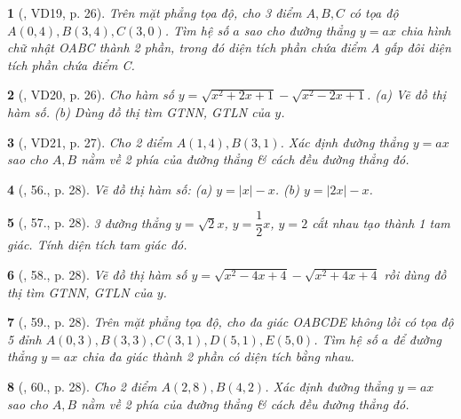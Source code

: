 \documentclass{article}
\newtheorem{baitoan}{}
\begin{document}
\begin{baitoan}[\cite{Binh_Toan_9_tap_1}, VD19, p. 26]
	Trên mặt phẳng tọa độ, cho 3 điểm $A,B,C$ có tọa độ $A(0,4),B(3,4),C(3,0)$. Tìm hệ số $a$ sao cho đường thẳng $y = ax$ chia hình chữ nhật OABC thành 2 phần, trong đó diện tích phần chứa điểm A gấp đôi diện tích phần chứa điểm C.
\end{baitoan}

\begin{baitoan}[\cite{Binh_Toan_9_tap_1}, VD20, p. 26]
	Cho hàm số $y = \sqrt{x^2 + 2x + 1} - \sqrt{x^2 - 2x + 1}$. (a) Vẽ đồ thị hàm số. (b) Dùng đồ thị tìm {\rm GTNN, GTLN} của $y$.
\end{baitoan}

\begin{baitoan}[\cite{Binh_Toan_9_tap_1}, VD21, p. 27]
	Cho 2 điểm $A(1,4),B(3,1)$. Xác định đường thẳng $y = ax$ sao cho $A,B$ nằm về 2 phía của đường thẳng \& cách đều đường thẳng đó.
\end{baitoan}

\begin{baitoan}[\cite{Binh_Toan_9_tap_1}, 56., p. 28]
	Vẽ đồ thị hàm số: (a) $y = |x| - x$. (b) $y = |2x| - x$.
\end{baitoan}

\begin{baitoan}[\cite{Binh_Toan_9_tap_1}, 57., p. 28]
	3 đường thẳng $y = \sqrt{2}x$, $y = \dfrac{1}{2}x$, $y = 2$ cắt nhau tạo thành 1 tam giác. Tính diện tích tam giác đó.
\end{baitoan}

\begin{baitoan}[\cite{Binh_Toan_9_tap_1}, 58., p. 28]
	Vẽ đồ thị hàm số $y = \sqrt{x^2 - 4x + 4} - \sqrt{x^2 + 4x + 4}$ rồi dùng đồ thị tìm {\rm GTNN, GTLN} của $y$.
\end{baitoan}

\begin{baitoan}[\cite{Binh_Toan_9_tap_1}, 59., p. 28]
	Trên mặt phẳng tọa độ, cho đa giác OABCDE không lồi có tọa độ 5 đỉnh $A(0,3),B(3,3),C(3,1),D(5,1),E(5,0)$. Tìm hệ số $a$ để đường thẳng $y = ax$ chia đa giác thành 2 phần có diện tích bằng nhau.
\end{baitoan}

\begin{baitoan}[\cite{Binh_Toan_9_tap_1}, 60., p. 28]
	Cho 2 điểm $A(2,8),B(4,2)$. Xác định đường thẳng $y = ax$ sao cho $A,B$ nằm về 2 phía của đường thẳng \& cách đều đường thẳng đó.
\end{baitoan}
\end{document}

